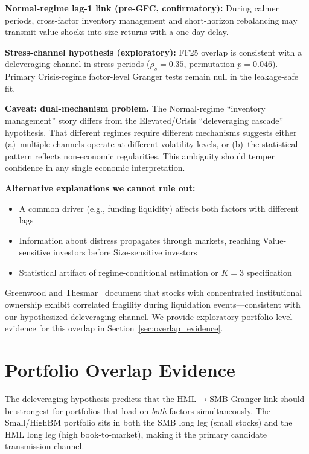 \documentclass[sigconf,anonymous]{acmart}
\begin{document}
\textbf{Normal-regime lag-1 link (pre-GFC, confirmatory):} During calmer periods,
cross-factor inventory management and short-horizon rebalancing may transmit
value shocks into size returns with a one-day delay.

\textbf{Stress-channel hypothesis (exploratory):} FF25 overlap is consistent with
a deleveraging channel in stress periods
($\rho_s = 0.35$, permutation $p = 0.046$). Primary Crisis-regime factor-level
Granger tests remain null in the leakage-safe fit.

\textbf{Caveat: dual-mechanism problem.} The Normal-regime ``inventory management''
story differs from the Elevated/Crisis ``deleveraging cascade'' hypothesis.
That different regimes require different mechanisms suggests either (a)~multiple
channels operate at different volatility levels, or (b)~the statistical pattern
reflects non-economic regularities. This ambiguity should temper confidence in
any single economic interpretation.

\textbf{Alternative explanations we cannot rule out:}
\begin{itemize}
    \item A common driver (e.g., funding liquidity) affects both factors with different lags
    \item Information about distress propagates through markets, reaching Value-sensitive
    investors before Size-sensitive investors
    \item Statistical artifact of regime-conditional estimation or $K = 3$ specification
\end{itemize}

Greenwood and Thesmar~\cite{greenwood2011stock} document that stocks with
concentrated institutional ownership exhibit correlated fragility during
liquidation events---consistent with our hypothesized deleveraging channel.
We provide exploratory portfolio-level evidence for this overlap in
Section~\ref{sec:overlap_evidence}.

\section{Portfolio Overlap Evidence}
\label{app:overlap}

The deleveraging hypothesis predicts that the HML$\to$SMB Granger link should
be strongest for portfolios that load on \emph{both} factors simultaneously.
The Small\-/HighBM portfolio sits in both the SMB long leg (small stocks) and
the HML long leg (high book-to-market), making it the primary candidate
transmission channel.
\end{document}
